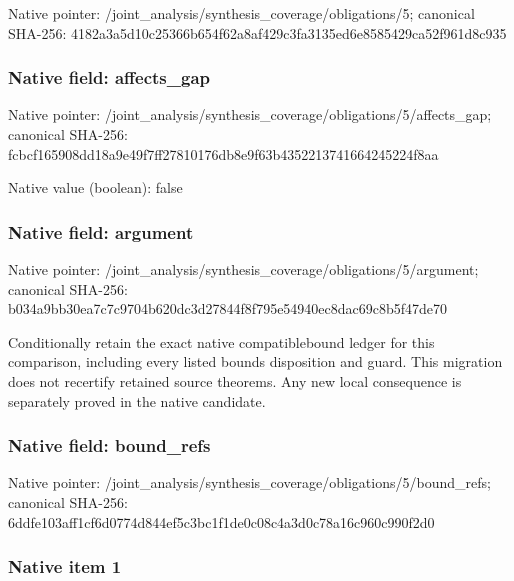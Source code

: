 \documentclass[10pt,a4paper]{article}
\begin{document}
Native pointer: /joint\_analysis/synthesi\allowbreak{}s\_coverage/obligations/5; canonical SHA-256: 4182a3a5d10c25366b654f62\allowbreak{}a8af429c3fa3135ed6e85854\allowbreak{}29ca52f961d8c935



\subsubsection{Native field: affects\_gap}


Native pointer: /joint\_analysis/synthesi\allowbreak{}s\_coverage/obligations/5\allowbreak{}/affects\_gap; canonical SHA-256: fcbcf165908dd18a9e49f7ff\allowbreak{}27810176db8e9f63b4352213\allowbreak{}741664245224f8aa



Native value (boolean): false



\subsubsection{Native field: argument}


Native pointer: /joint\_analysis/synthesi\allowbreak{}s\_coverage/obligations/5\allowbreak{}/argument; canonical SHA-256: b034a9bb30ea7c7c9704b620\allowbreak{}dc3d27844f8f795e54940ec8\allowbreak{}dac69c8b5f47de70


Conditionally retain the exact native compatiblebound ledger for this comparison, including every listed bounds disposition and guard. This migration does not recertify retained source theorems. Any new local consequence is separately proved in the native candidate.


\subsubsection{Native field: bound\_refs}


Native pointer: /joint\_analysis/synthesi\allowbreak{}s\_coverage/obligations/5\allowbreak{}/bound\_refs; canonical SHA-256: 6ddfe103aff1cf6d0774d844\allowbreak{}ef5c3bc1f1de0c08c4a3d0c7\allowbreak{}8a16c960c990f2d0



\subsubsection{Native item 1}
\end{document}
